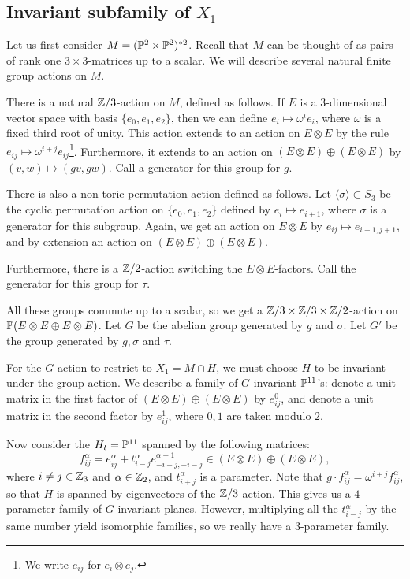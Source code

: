 \subsection{Invariant subfamily of $X_1$} 

Let us first consider $M=(\P^2 \times \P^2)^{\ast 2}$. Recall that $M$ can be thought of as pairs of rank one $3 \times 3$-matrices up to a scalar. We will describe several natural finite group actions on $M$.

There is a natural $\Z/3$-action on $M$, defined as follows. If $E$ is a $3$-dimensional vector space with basis $\{e_0,e_1,e_2\}$, then we can define $e_i \mapsto \omega^i e_i$, where $\omega$ is a fixed third root of unity. This action extends to an action on $E \otimes E$ by the rule $e_{ij} \mapsto \omega^{i+j} e_{ij}$\footnote{We write $e_{ij}$ for $e_i \otimes e_j$.}. Furthermore, it extends to an action on $(E \otimes E) \oplus (E \otimes E)$ by $(v,w) \mapsto (gv,gw)$. Call a generator for this group for $g$. 

There is also a non-toric permutation action defined as follows. Let $\langle \sigma \rangle \subset S_3$ be the cyclic permutation action on $\{ e_0,e_1,e_2 \}$ defined by $e_i \mapsto e_{i+1}$, where $\sigma$ is a generator for this subgroup. Again, we get an action on $E \otimes E$ by $e_{ij} \mapsto e_{i+1,j+1}$, and by extension an action on $(E \otimes E) \oplus (E \otimes E)$.

Furthermore, there is a $\Z/2$-action switching the $E \otimes E$-factors. Call the generator for this group for $\tau$.

All these groups commute up to a scalar, so we get a $\Z/3 \times \Z/3 \times \Z/2$-action on $\P(E \otimes E \oplus E \otimes E)$. Let $G$ be the abelian group generated by $g$ and $\sigma$. Let $G'$ be the group generated by $g, \sigma$ and $\tau$. 

For the $G$-action to restrict to $X_1=M \cap H$, we must choose $H$ to be invariant under the group action. We describe a family of $G$-invariant $\P^{11}$'s: denote a unit matrix in the first factor of $(E \otimes E) \oplus (E \otimes E)$ by $e_{ij}^0$, and denote a unit matrix in the second factor by $e_{ij}^1$, where $0,1$ are taken modulo $2$. 

Now consider the $H_t=\P^{11}$ spanned by the following matrices:
\begin{equation}
\label{eq:fija}
f_{ij}^\alpha = e_{ij}^\alpha + t_{i-j}^\alpha e_{-i-j,-i-j}^{\alpha+1} \in (E \otimes E) \oplus (E \otimes E),
\end{equation}
where $i \neq j \in \Z_3$ and $\alpha \in \Z_2$, and $t_{i+j}^\alpha$ is a parameter. Note that $g \cdot f_{ij}^\alpha = \omega^{i+j} f_{ij}^\alpha$, so that $H$ is spanned by eigenvectors of the $\Z/3$-action. This gives us a $4$-parameter family of $G$-invariant planes. However, multiplying all the $t_{i-j}^\alpha$ by the same number yield isomorphic families, so we really have a $3$-parameter family.

